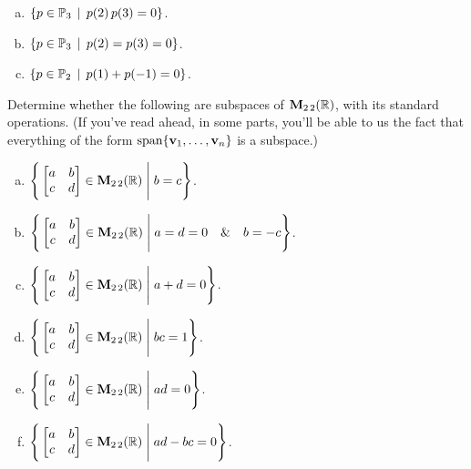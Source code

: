 \begin{prob}
\begin{enumerate}[a)]
\item\sov  $ \{p \in \mathbb{P}_3 \,\mid \,  p(2)\,p(3)=0 \}$.  \medskip
%

\item  $ \{p \in \mathbb{P}_3 \,\mid \,  p(2)=p(3)=0 \}$.  \medskip
%

\item\sov  $ \{p \in \mathbb{P}_2 \,\mid \,  p(1)+p(-1)=0 \}$.      \medskip
%

\end{enumerate}
 
\end{prob} \begin{prob} \label{prob05.4} Determine whether   the following are subspaces of $\mathbf{M}_{2 \,2}(\mathbb{R})$, with its standard operations. (If you've read ahead, in some parts, you'll be able to us the fact that everything of the form $\textrm{span}\{\mathbf{v}_1, \dots, \mathbf{v}_n\}$  is a subspace.)
\begin{enumerate}[a)]\medskip


\item  $\Bigg\{  \bmatrix a&b\\ c&d\endbmatrix \in \M_{2 \,2}(\R) \;\Bigg|\; b=c\Bigg\}$.\medskip \medskip
%

\item\sov  $\Bigg\{  \bmatrix a&b\\ c&d\endbmatrix \in \M_{2 \,2}(\R) \;\Bigg|\;a=d=0\quad \&\quad b=-c  \Bigg\}$.\medskip \medskip
%

\item  $\Bigg\{  \bmatrix a&b\\ c&d\endbmatrix \in \M_{2 \,2}(\R) \;\Bigg|\; a+d=0\Bigg\}$. \medskip
%
\item\sov  $\Bigg\{  \bmatrix a&b\\ c&d\endbmatrix \in \M_{2 \,2}(\R) \;\Bigg|\; bc=1\Bigg\}$.      \medskip
%
\item  $\Bigg\{  \bmatrix a&b\\ c&d\endbmatrix \in \M_{2 \,2}(\R) \;\Bigg|\; ad=0\Bigg\}$.      \medskip
%
\item  $\Bigg\{  \bmatrix a&b\\ c&d\endbmatrix \in \M_{2 \,2}(\R) \;\Bigg|\; ad-bc=0\Bigg\}$. \medskip
%






\end{enumerate}

\end{prob}
